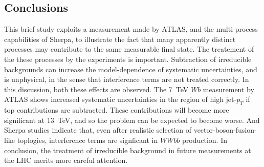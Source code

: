 \documentclass[11pt]{cernrep}
\begin{document}
\subsection{Conclusions}\label{sec:conclusions}

This brief study exploits a measurement made by ATLAS, and the multi-process capabilities of Sherpa,
to illustrate the fact that many apparently distinct processes may contribute to the same measurable
final state. The treatement of the these processes by the experiments is important. Subtraction of
irreducible backgrounds can increase the model-dependence of systematic uncertainties, and is
unphysical, in the sense that interference terms are not treated correctly. In this discussion,
both these effects are observed.  The 7~TeV $Wb$ measurement by ATLAS shows increased systematic
uncertainties in the region of high jet-$p_T$ if top contributions are subtracted.  These
contributions will become more significant at 13~TeV, and so the problem can be expected to become
worse. And Sherpa studies indicate that, even after realistic selection of vector-boson-fusion-like
toplogies, interference terms are signficant in $WWbb$ production.  In conclusion, the treatment of
irreducible background in future measurements at the LHC merits more careful attention.


\end{document}
